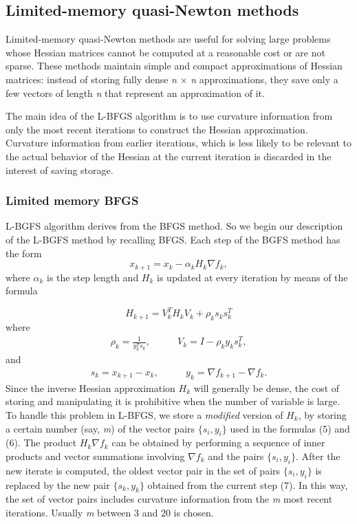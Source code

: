 \subsection{Limited-memory quasi-Newton methods}
Limited-memory quasi-Newton methods are useful for solving large problems whose Hessian matrices cannot be computed at a reasonable cost or are not sparse.  
These methods maintain simple and compact approximations of Hessian matrices: instead of storing fully dense \textit{n} $\times$ \textit{n} approximations, they save only a few vectors of length \textit{n} that represent an approximation of it. 
 
The main idea of the L-BFGS algorithm is to use curvature information from only the most recent iterations to construct the Hessian approximation. Curvature information from earlier iterations, which is less likely to be relevant to the actual behavior of the Hessian at the current iteration is discarded in the interest of saving storage. 

\subsubsection{Limited memory BFGS}
L-BGFS algorithm derives from the BFGS method. So we begin our description of the L-BGFS method by recalling BFGS. 
Each step of the BGFS method has the form
\begin{equation}
\label{stepBFGS}
x_{k+1}=x_{k}-\alpha_{k}H_{k}\nabla f_{k} ,
\end{equation}
where $\alpha_{k}$ is the step length and $H_{k}$
is updated at every iteration by means of the formula

\begin{equation}
H_{k+1} = V^T_{k}H_{k}V_{k}+ \rho_{k}s_{k}s^T_{k}
\end{equation}
where 
\begin{align}
\rho_{k}=\frac{1}{y^T_{k}s_{k}}, & \qquad V_{k}=I-\rho_{k}y_{k}s^T_{k}, 
\end{align} 
and 
\begin{align}
s_{k}=x_{k+1}-x_{k}, & \qquad
y_{k}=\nabla f_{k+1} - \nabla f_{k}.
\end{align}
Since the inverse Hessian approximation $H_{k}$ will generally be dense, the cost of storing and manipulating it is prohibitive when the number of variable is large. To handle this problem in L-BFGS, we store a \textit{modified} version of $H_{k}$, by storing a certain number (say, \textit{m}) of the vector pairs $\{s_{i},y_{i}\}$ used in the formulas (5) and (6). The product $H_{k}\nabla f_{k}$ can be obtained by performing a sequence of inner products and vector summations involving $\nabla f_{k}$ and the pairs $\{s_{i},y_{i}\}$. After the new iterate is computed, the oldest vector pair in the set of pairs $\{s_{i},y_{i}\}$ is replaced by the new pair $\{s_{k},y_{k}\}$ obtained from the current step (7).
In this way, the set of vector pairs includes curvature information from the \textit{m} most recent iterations. Usually \textit{m} between 3 and 20 is chosen. 

